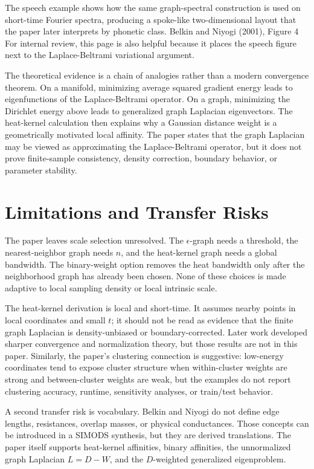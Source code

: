 \documentclass[11pt]{article}
\begin{document}
{The speech example shows how the same graph-spectral construction is used on
short-time Fourier spectra, producing a spoke-like two-dimensional layout that
the paper later interprets by phonetic class.}
{Belkin and Niyogi (2001), Figure 4}
{For internal review, this page is also helpful because it places the speech
figure next to the Laplace-Beltrami variational argument.}

The theoretical evidence is a chain of analogies rather than a modern convergence
theorem. On a manifold, minimizing average squared gradient energy leads to
eigenfunctions of the Laplace-Beltrami operator. On a graph, minimizing the
Dirichlet energy above leads to generalized graph Laplacian eigenvectors. The
heat-kernel calculation then explains why a Gaussian distance weight is a
geometrically motivated local affinity. The paper states that the graph
Laplacian may be viewed as approximating the Laplace-Beltrami operator, but it
does not prove finite-sample consistency, density correction, boundary behavior,
or parameter stability.

\section{Limitations and Transfer Risks}

The paper leaves scale selection unresolved. The \(\epsilon\)-graph needs a
threshold, the nearest-neighbor graph needs \(n\), and the heat-kernel graph
needs a global bandwidth. The binary-weight option removes the heat bandwidth
only after the neighborhood graph has already been chosen. None of these choices
is made adaptive to local sampling density or local intrinsic scale.

The heat-kernel derivation is local and short-time. It assumes nearby points in
local coordinates and small \(t\); it should not be read as evidence that the
finite graph Laplacian is density-unbiased or boundary-corrected. Later work
developed sharper convergence and normalization theory, but those results are
not in this paper. Similarly, the paper's clustering connection is suggestive:
low-energy coordinates tend to expose cluster structure when within-cluster
weights are strong and between-cluster weights are weak, but the examples do not
report clustering accuracy, runtime, sensitivity analyses, or train/test
behavior.

A second transfer risk is vocabulary. Belkin and Niyogi do not define edge
lengths, resistances, overlap masses, or physical conductances. Those concepts
can be introduced in a SIMODS synthesis, but they are derived translations. The
paper itself supports heat-kernel affinities, binary affinities, the unnormalized
graph Laplacian \(L=D-W\), and the \(D\)-weighted generalized eigenproblem.
\end{document}
